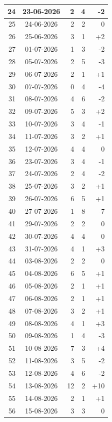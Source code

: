 \begin{longtable}{|r|c|r|r|r|}
24 & 23-06-2026 & 2 & 4 & -2 \\ \hline
25 & 24-06-2026 & 2 & 2 & 0 \\ \hline
26 & 25-06-2026 & 3 & 1 & +2 \\ \hline
27 & 01-07-2026 & 1 & 3 & -2 \\ \hline
28 & 05-07-2026 & 2 & 5 & -3 \\ \hline
29 & 06-07-2026 & 2 & 1 & +1 \\ \hline
30 & 07-07-2026 & 0 & 4 & -4 \\ \hline
31 & 08-07-2026 & 4 & 6 & -2 \\ \hline
32 & 09-07-2026 & 5 & 3 & +2 \\ \hline
33 & 10-07-2026 & 3 & 4 & -1 \\ \hline
34 & 11-07-2026 & 3 & 2 & +1 \\ \hline
35 & 12-07-2026 & 4 & 4 & 0 \\ \hline
36 & 23-07-2026 & 3 & 4 & -1 \\ \hline
37 & 24-07-2026 & 2 & 4 & -2 \\ \hline
38 & 25-07-2026 & 3 & 2 & +1 \\ \hline
39 & 26-07-2026 & 6 & 5 & +1 \\ \hline
40 & 27-07-2026 & 1 & 8 & -7 \\ \hline
41 & 29-07-2026 & 2 & 2 & 0 \\ \hline
42 & 30-07-2026 & 4 & 4 & 0 \\ \hline
43 & 31-07-2026 & 4 & 1 & +3 \\ \hline
44 & 03-08-2026 & 2 & 2 & 0 \\ \hline
45 & 04-08-2026 & 6 & 5 & +1 \\ \hline
46 & 05-08-2026 & 2 & 1 & +1 \\ \hline
47 & 06-08-2026 & 2 & 1 & +1 \\ \hline
48 & 07-08-2026 & 3 & 2 & +1 \\ \hline
49 & 08-08-2026 & 4 & 1 & +3 \\ \hline
50 & 09-08-2026 & 1 & 4 & -3 \\ \hline
51 & 10-08-2026 & 7 & 3 & +4 \\ \hline
52 & 11-08-2026 & 3 & 5 & -2 \\ \hline
53 & 12-08-2026 & 4 & 6 & -2 \\ \hline
54 & 13-08-2026 & 12 & 2 & +10 \\ \hline
55 & 14-08-2026 & 2 & 1 & +1 \\ \hline
56 & 15-08-2026 & 3 & 3 & 0 \\ \hline

\end{longtable}

